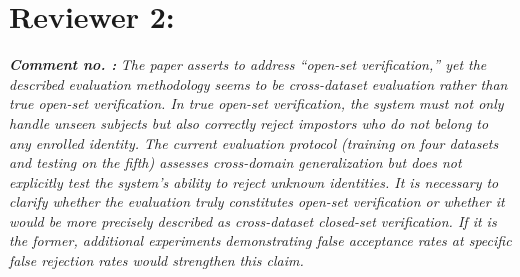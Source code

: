 \documentclass[11pt]{article}
\theoremstyle{remark}
\newcounter{mycounter} %
\newcommand\showReviewcounter{\stepcounter{mycounter}\themycounter}
\begin{document}
\section*{Reviewer  2:}
\textbf{\textit{Comment no. \showReviewcounter:}} 
\textit{The paper asserts to address ``open-set verification,'' yet the described evaluation methodology seems to be cross-dataset evaluation rather than true open-set verification. In true open-set verification, the system must not only handle unseen subjects but also correctly reject impostors who do not belong to any enrolled identity. The current evaluation protocol (training on four datasets and testing on the fifth) assesses cross-domain generalization but does not explicitly test the system's ability to reject unknown identities. It is necessary to clarify whether the evaluation truly constitutes open-set verification or whether it would be more precisely described as cross-dataset closed-set verification. If it is the former, additional experiments demonstrating false acceptance rates at specific false rejection rates would strengthen this claim.}
\color{black}
\end{document}
